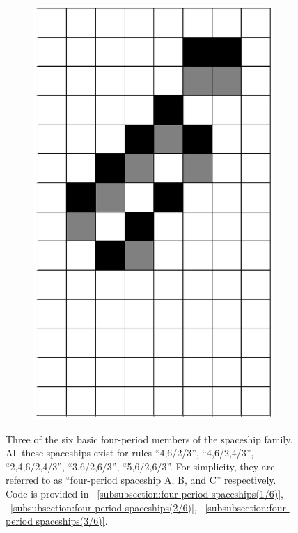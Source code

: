 \documentclass[12pt]{article}
\numberwithin{figure}{section} %
\begin{document}
\begin{figure}[H]
\begin{subfigure}{0.18\textwidth}
     		\includegraphics[width=\linewidth]{Section4/17.4}
     		\subcaption{}
   	\end{subfigure}
      	\newline
   	\setcounter{subfigure}{0}
	\caption[Three four-period spaceships]{Three of the six basic four-period members of the spaceship family. All these spaceships exist for rules “4,6/2/3”, “4,6/2,4/3”, “2,4,6/2,4/3”, “3,6/2,6/3”, “5,6/2,6/3”. For simplicity, they are referred to as “four-period spaceship A, B, and C” respectively. Code is provided in ~\ref{subsubsection:four-period spaceships(1/6)}, ~\ref{subsubsection:four-period spaceships(2/6)}, ~\ref{subsubsection:four-period spaceships(3/6)}.}
	\label{fig:four-period spaceships first half}
\end{figure}
   
\end{document}
